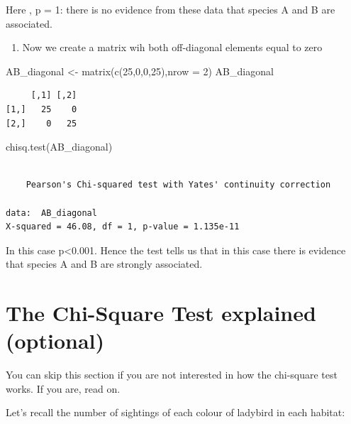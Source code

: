 \documentclass[
  letterpaper,
  DIV=11,
  numbers=noendperiod]{scrreprt}
\newenvironment{Shaded}{\begin{snugshade}}{\end{snugshade}}
\newcommand{\AttributeTok}[1]{\textcolor[rgb]{0.40,0.45,0.13}{#1}}
\newcommand{\DecValTok}[1]{\textcolor[rgb]{0.68,0.00,0.00}{#1}}
\newcommand{\FunctionTok}[1]{\textcolor[rgb]{0.28,0.35,0.67}{#1}}
\newcommand{\NormalTok}[1]{\textcolor[rgb]{0.00,0.23,0.31}{#1}}
\newcommand{\OtherTok}[1]{\textcolor[rgb]{0.00,0.23,0.31}{#1}}
\providecommand{\tightlist}{%
  \setlength{\itemsep}{0pt}\setlength{\parskip}{0pt}}\usepackage{longtable,booktabs,array}
\begin{document}
Here , p = 1: there is no evidence from these data that species A and B
are associated.

\begin{enumerate}
\def\labelenumi{\arabic{enumi}.}
\setcounter{enumi}{4}
\tightlist
\item
  Now we create a matrix wih both off-diagonal elements equal to zero
\end{enumerate}

\begin{Shaded}
\begin{Highlighting}[]
\NormalTok{AB\_diagonal }\OtherTok{\textless{}{-}} \FunctionTok{matrix}\NormalTok{(}\FunctionTok{c}\NormalTok{(}\DecValTok{25}\NormalTok{,}\DecValTok{0}\NormalTok{,}\DecValTok{0}\NormalTok{,}\DecValTok{25}\NormalTok{),}\AttributeTok{nrow =} \DecValTok{2}\NormalTok{)}
\NormalTok{AB\_diagonal}
\end{Highlighting}
\end{Shaded}

\begin{verbatim}
     [,1] [,2]
[1,]   25    0
[2,]    0   25
\end{verbatim}

\begin{Shaded}
\begin{Highlighting}[]
\FunctionTok{chisq.test}\NormalTok{(AB\_diagonal)}
\end{Highlighting}
\end{Shaded}

\begin{verbatim}

    Pearson's Chi-squared test with Yates' continuity correction

data:  AB_diagonal
X-squared = 46.08, df = 1, p-value = 1.135e-11
\end{verbatim}

In this case p\textless0.001. Hence the test tells us that in this case
there is evidence that species A and B are strongly associated.

\section{The Chi-Square Test explained
(optional)}\label{the-chi-square-test-explained-optional}

You can skip this section if you are not interested in how the
chi-square test works. If you are, read on.

Let's recall the number of sightings of each colour of ladybird in each
habitat:
\end{document}
